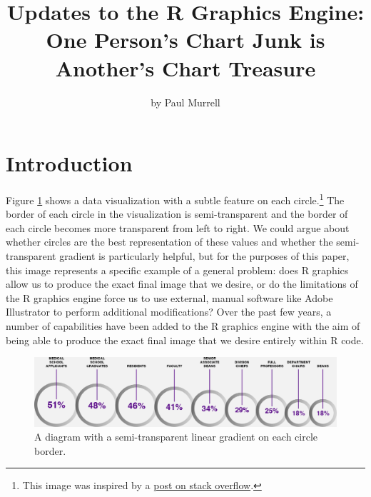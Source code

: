 \title{Updates to the R Graphics Engine: One Person's Chart Junk is Another's Chart Treasure}


\author{by Paul Murrell}

\maketitle


\hypertarget{introduction}{%
\section{Introduction}\label{introduction}}

Figure \ref{fig:diagram} shows a data visualization
with a subtle feature on each
circle.\footnote{This image was inspired by a \href{https://stackoverflow.com/questions/69755844/is-it-possible-to-draw-the-following-diagram-in-r}{post on stack overflow}.}
The border of each circle in the visualization is
semi-transparent and the border of each circle becomes
more transparent from left to right. We could argue about whether
circles are the best representation of these values and whether the
semi-transparent gradient is particularly helpful, but for the
purposes of this paper, this image
represents a specific example of a general problem: does R graphics
allow us to produce the exact final image that we desire, or
do the limitations of the R graphics engine
force us to use external, manual software
like Adobe Illustrator to perform additional
modifications? Over the past few years, a number of capabilities
have been added to the R graphics engine with the aim of being
able to produce the exact final image that we desire entirely within
R code.

\begin{figure}[h]
\includegraphics[width=1\linewidth]{murrell-definitions-2023_files/figure-latex/diagram-1} \caption{A diagram with a semi-transparent linear gradient on each circle border.}\label{fig:diagram}
\end{figure}

